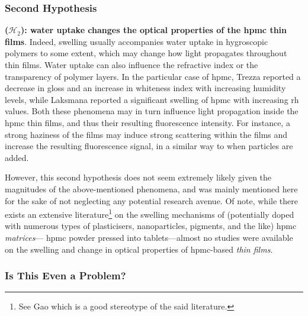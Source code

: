 \subsubsection{Second Hypothesis}

\textbf{($\mathcal{H}_2$): water uptake changes the optical properties of the \gls{hpmc} thin films}. Indeed, swelling usually accompanies water uptake in hygroscopic polymers to some extent\cite{grossutti2020}, which may  change how light propagates throughout thin films. Water uptake can also influence the refractive index\cite{watanabe1998} or the transparency of polymer layers\cite{gulsen2006}. In the particular case of \gls{hpmc}, Trezza \etal{}\cite{trezza2000} reported a decrease in gloss and an increase in whiteness index with increasing humidity levels, while Laksmana \etal{}\cite{laksmana2008} reported a significant swelling of \gls{hpmc} with increasing \gls{rh} values. Both these phenomena may in turn influence light propagation inside the \gls{hpmc} thin films, and thus their resulting fluorescence intensity. For instance, a strong haziness of the films may induce strong scattering within the films and increase the resulting fluorescence signal, in a similar way to when  particles are added\cite{dansby2010}.

However, this second hypothesis does not seem extremely likely given the magnitudes of the above-mentioned phenomena, and was mainly mentioned here for the sake of not neglecting any potential research avenue. Of note, while there exists an extensive literature\footnote{See \eg{} Gao \etal{}\cite{gao1996} which is a good stereotype of the said literature.} on the swelling mechanisms of (potentially doped with numerous types of plasticisers, nanoparticles, pigments, and the like) \gls{hpmc} \emph{matrices}---\ie{} \gls{hpmc} powder pressed into tablets---almost no studies were available on the swelling and change in optical properties of \gls{hpmc}-based \emph{thin films}.

\subsubsection{Is This Even a Problem?}

